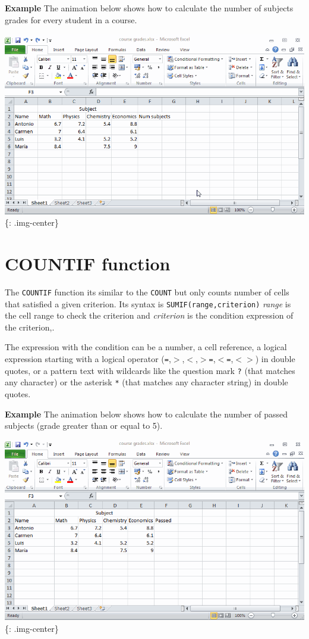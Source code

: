 \textbf{Example} The animation below shows how to calculate the number of subjects grades for every student in a course. 

\includegraphics[keepaspectratio,width=\textwidth,height=0.75\textheight]{img/example_function_count.gif}
\{: .img-center\}

\section{COUNTIF function}
\label{countiffunction}

The \texttt{COUNTIF} function its similar to the \texttt{COUNT} but only counts number of cells that satisfied a given criterion. Its syntax is \texttt{SUMIF(range,criterion)} \emph{range} is the cell range to check the criterion and \emph{criterion} is the condition expression of the criterion,.

The expression with the condition can be a number, a cell reference, a logical expression starting with a logical operator (\texttt{=},\texttt{$>$},\texttt{$<$},\texttt{$>$=},\texttt{$<$=},\texttt{$<$$>$}) in double quotes, or a pattern text with wildcards like the question mark \texttt{?} (that matches any character) or the asterisk \texttt{*} (that matches any character string) in double quotes.

\textbf{Example} The animation below shows how to calculate the number of passed subjects (grade greater than or equal to 5). 

\includegraphics[keepaspectratio,width=\textwidth,height=0.75\textheight]{img/example_function_countif.gif}
\{: .img-center\}

